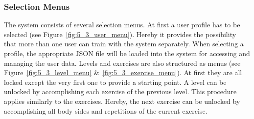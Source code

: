 \subsubsection{Selection Menus}
The system consists of several selection menus. At first a user profile has to be selected (see Figure~\ref{fig:5_3_user_menu}). Hereby it provides the possibility that more than one user can train with the system separately.
When selecting a profile, the appropriate JSON file will be loaded into the system for accessing and managing the user data.
Levels and exercises are also structured as menus (see Figure~\ref{fig:5_3_level_menu} \&~\ref{fig:5_3_exercise_menu}).
At first they are all locked except the very first one to provide a starting point.
A level can be unlocked by accomplishing each exercise of the previous level.
This procedure applies similarly to the exercises.
Hereby, the next exercise can be unlocked by accomplishing all body sides and repetitions of the current exercise.
